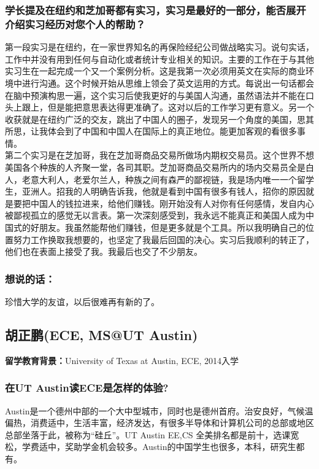 \documentclass[a4paper,UTF8]{book}
\begin{document}
    \subsubsection*{学长提及在纽约和芝加哥都有实习，实习是最好的一部分，能否展开介绍实习经历对您个人的帮助？}
    第一段实习是在纽约，在一家世界知名的再保险经纪公司做战略实习。说句实话，工作中并没有用到任何与自动化或者统计专业相关的知识。主要的工作在于与其他实习生在一起完成一个又一个案例分析。这是我第一次必须用英文在实际的商业环境中进行沟通。这个时候开始从思维上领会了英文运用的方式。每说出一句话都会在脑中预演构思一遍，这个实习后使我更好的与美国人沟通，虽然语法并不能在口头上跟上，但是能把意思表达得更准确了。这对以后的工作学习更有意义。另一个收获就是在纽约广泛的交友，跳出了中国人的圈子，发现另一个角度的美国，思其所思，让我体会到了中国和中国人在国际上的真正地位。能更加客观的看很多事情。\\
    第二个实习是在芝加哥，我在芝加哥商品交易所做场内期权交易员。这个世界不想美国各个种族的人齐聚一堂，各司其职。芝加哥商品交易所内的场内交易员全是白人，老意大利人，老爱尔兰人，种族之间有森严的鄙视链，我是场内唯一一个留学生，亚洲人。招我的人明确告诉我，他就是看到中国有很多有钱人，招你的原因就是要把中国人的钱拉进来，给他们赚钱。刚开始没有人对你有任何感情，发自内心被鄙视孤立的感觉无以言表。第一次深刻感受到，我永远不能真正和美国人成为中国式的好朋友。我虽然能帮他们赚钱，但是更多就是个工具。所以我明确自己的位置努力工作换取我想要的，也坚定了我最后回国的决心。实习后我顺利的转正了，他们也在表面上接受了我。我最后也交了不少朋友。

    \subsubsection{想说的话：}
    珍惜大学的友谊，以后很难再有新的了。



\clearpage
\subsection{胡正鹏(ECE, MS@UT Austin)}
    \textbf{留学教育背景：}University of Texas at Austin, ECE, 2014入学

    \subsubsection*{在UT Austin读ECE是怎样的体验?}
    Austin是一个德州中部的一个大中型城市，同时也是德州首府。治安良好，气候温偏热，消费适中，生活丰富，经济发达，有很多半导体和计算机公司的总部或地区总部坐落于此，被称为“硅丘”。UT Austin EE,CS 全美排名都是前十，选课宽松，学费适中，奖助学金机会较多。Austin的中国学生也很多，本科，研究生都有。
\end{document}
